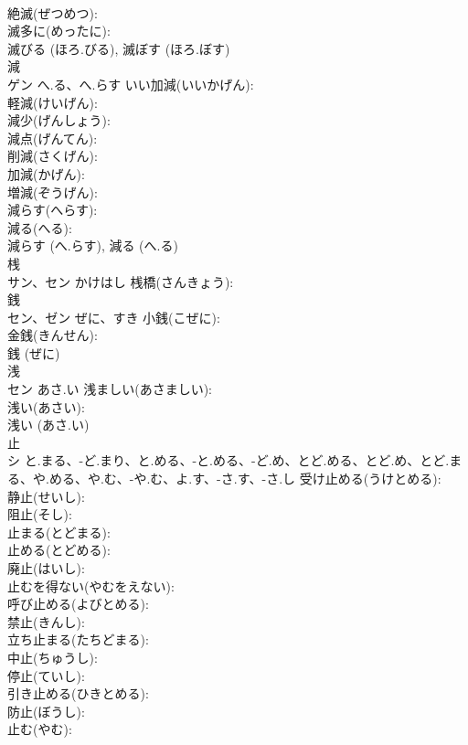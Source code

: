 \documentclass[8pt]{extreport}
\begin{document}
\begin{CJK}{UTF8}{min}
\\	絶滅(ぜつめつ): 
\\	滅多に(めったに): 
\\	滅びる (ほろ.びる), 滅ぼす (ほろ.ぼす)
\\	減			
\\	ゲン	へ.る、へ.らす	いい加減(いいかげん): 
\\	軽減(けいげん): 
\\	減少(げんしょう): 
\\	減点(げんてん): 
\\	削減(さくげん): 
\\	加減(かげん): 
\\	増減(ぞうげん): 
\\	減らす(へらす): 
\\	減る(へる): 
\\	減らす (へ.らす), 減る (へ.る)
\\	桟			
\\	サン、セン	かけはし	桟橋(さんきょう): 
\\	銭			
\\	セン、ゼン	ぜに、すき	小銭(こぜに): 
\\	金銭(きんせん): 
\\	銭 (ぜに)
\\	浅			
\\	セン	あさ.い	浅ましい(あさましい): 
\\	浅い(あさい): 
\\	浅い (あさ.い)
\\	止			
\\	シ	と.まる、-ど.まり、と.める、-と.める、-ど.め、とど.める、とど.め、とど.まる、や.める、や.む、-や.む、よ.す、-さ.す、-さ.し	受け止める(うけとめる): 
\\	静止(せいし): 
\\	阻止(そし): 
\\	止まる(とどまる): 
\\	止める(とどめる): 
\\	廃止(はいし): 
\\	止むを得ない(やむをえない): 
\\	呼び止める(よびとめる): 
\\	禁止(きんし): 
\\	立ち止まる(たちどまる): 
\\	中止(ちゅうし): 
\\	停止(ていし): 
\\	引き止める(ひきとめる): 
\\	防止(ぼうし): 
\\	止む(やむ): 

\end{CJK}
\end{document}
